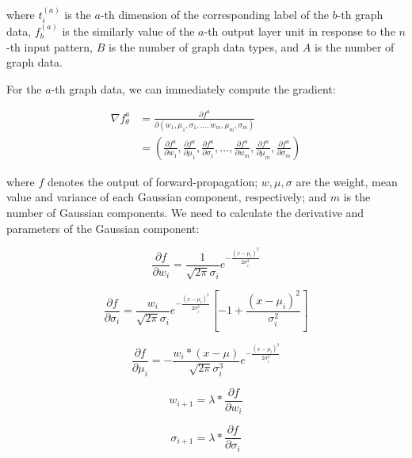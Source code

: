 \documentclass[11pt]{article}
\begin{document}
where  $t_i^{(a)}$ is the $a$-th dimension of the corresponding label of the $b$-th graph data, $f_b^{(a)}$ is the similarly value of the $a$-th output layer unit in response to the $n$-th input pattern, $B$ is the number of graph data types, and $A$ is the number of graph data.





For the $a$-th graph data, we can immediately compute the gradient:


\begin{equation}
\begin{split}
\nabla f_\theta^{a} &= \frac{\partial f^{a}}{\partial(w_1,\mu_1,\sigma_1,...,w_m,\mu_m,\sigma_m)} \\
&=(\frac{\partial f^{a}}{\partial w_1},\frac{\partial f^{a}}{\partial \mu_1},\frac{\partial f^{a}}{\partial \sigma_1},...,\frac{\partial f^{a}}{\partial w_m},\frac{\partial f^{a}}{\partial \mu_m},\frac{\partial f^{a}}{\partial \sigma_m})
\end{split}
\end{equation}

where $f$ denotes the output of forward-propagation; $w, \mu, \sigma$ are the weight, mean value and variance of each Gaussian component, respectively; and $m$ is the number of Gaussian components. We need to calculate the derivative and parameters of the Gaussian component:

\begin{equation}
\frac{\partial f}{\partial w_i} = \frac{1}{\sqrt{2\pi}\sigma_i}e^{-\frac{(x-\mu_i)^2}{2\sigma_i^2}}
\end{equation}

\begin{equation}
\frac{\partial f}{\partial \sigma_i} = \frac{w_i}{\sqrt{2\pi}\sigma_i}e^{-\frac{(x-\mu_i)^2}{2\sigma_i^2}}[-1+\frac{(x-\mu_i)^2}{\sigma_i^2}]
\end{equation}

\begin{equation}
\frac{\partial f}{\partial \mu_i} = -\frac{{w_i}*(x-\mu)}{\sqrt{2\pi}\sigma_i^3}e^{-\frac{(x-\mu_i)^2}{2\sigma_i^2}}
\end{equation}

\begin{equation}
w_{i+1} = \lambda*\frac{\partial f}{\partial w_i}
\end{equation}

\begin{equation}
\sigma_{i+1} = \lambda*\frac{\partial f}{\partial \sigma_i}
\end{equation}
\end{document}
